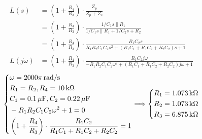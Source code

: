 \documentclass{article}
\newcommand{\unit}[1]{{\rm\,#1}}
\begin{document}
\section{}
\begin{align*}
L(s)&=\left(1+\frac{R_4}{R_3}\right)\cdot\frac{Z_p}{Z_p+Z_s}\\
&=\left(1+\frac{R_4}{R_3}\right)\cdot\frac{1/C_1s\parallel R_1}{1/C_1s\parallel R_1+1/C_2s+R_2}\\
&=\left(1+\frac{R_4}{R_3}\right)\cdot\frac{R_1C_2s}{R_1R_2C_1C_2s^2+(R_1C_1+R_1C_2+R_2C_2)s+1}\\
L(j\omega)&=\left(1+\frac{R_4}{R_3}\right)\cdot\frac{R_1C_2j\omega}{-R_1R_2C_1C_2\omega^2+(R_1C_1+R_1C_2+R_2C_2)j\omega+1}
\end{align*}
$$\left\{\begin{aligned}
&\omega=2000\pi\unit{rad/s}\\
&R_1=R_2,R_4=10\unit{k\Omega}\\
&C_1=0.1\unit{\mu F},C_2=0.22\unit{\mu F}\\
&-R_1R_2C_1C_2\omega^2+1=0\\
&\left(1+\frac{R_4}{R_3}\right)\cdot\frac{R_1C_2}{R_1C_1+R_1C_2+R_2C_2}=1
\end{aligned}\right.\Longrightarrow\left\{\begin{aligned}
R_1&=1.073\unit{k\Omega}\\
R_2&=1.073\unit{k\Omega}\\
R_3&=6.875\unit{k\Omega}
\end{aligned}\right.$$

\section{}
\end{document}
